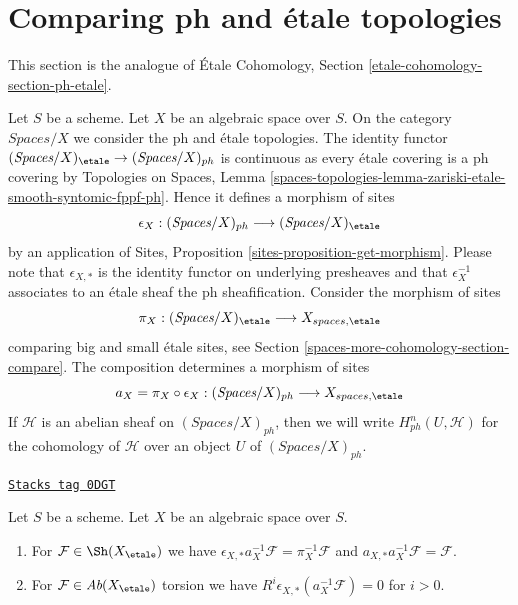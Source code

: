 \section{Comparing ph and \'etale topologies}
\label{spaces-more-cohomology-section-ph-etale}
This section is the analogue of
\'Etale Cohomology, Section \ref{etale-cohomology-section-ph-etale}.

\medskip\noindent
Let $S$ be a scheme. Let $X$ be an algebraic space over $S$.
On the category $\textit{Spaces}/X$ we consider the ph
and \'etale topologies. The identity functor
$(\textit{Spaces}/X)_\etale \to (\textit{Spaces}/X)_{ph}$
is continuous as every \'etale covering is a ph covering by
Topologies on Spaces, Lemma
\ref{spaces-topologies-lemma-zariski-etale-smooth-syntomic-fppf-ph}.
Hence it defines a morphism of sites
$$
\epsilon_X :
(\textit{Spaces}/X)_{ph} \longrightarrow (\textit{Spaces}/X)_\etale
$$
by an application of Sites, Proposition \ref{sites-proposition-get-morphism}.
Please note that $\epsilon_{X, *}$ is the identity functor on underlying
presheaves and that $\epsilon_X^{-1}$ associates to an \'etale sheaf the
ph sheafification.
Consider the morphism of sites
$$
\pi_X : (\textit{Spaces}/X)_\etale \longrightarrow X_{spaces, \etale}
$$
comparing big and small \'etale sites, see Section \ref{spaces-more-cohomology-section-compare}.
The composition determines a morphism of sites
$$
a_X = \pi_X \circ \epsilon_X :
(\textit{Spaces}/X)_{ph}
\longrightarrow
X_{spaces, \etale}
$$
If $\mathcal{H}$ is an abelian sheaf on $(\textit{Spaces}/X)_{ph}$,
then we will write $H^n_{ph}(U, \mathcal{H})$ for the cohomology
of $\mathcal{H}$ over an object $U$ of $(\textit{Spaces}/X)_{ph}$.

\begin{lemma}
\label{spaces-more-cohomology-lemma-comparison-ph-etale}
\href{https://stacks.math.columbia.edu/tag/0DGT}{\texttt{Stacks tag 0DGT}}

Let $S$ be a scheme. Let $X$ be an algebraic space over $S$.
\begin{enumerate}
\item For $\mathcal{F} \in \Sh(X_\etale)$ we have
$\epsilon_{X, *}a_X^{-1}\mathcal{F} = \pi_X^{-1}\mathcal{F}$
and $a_{X, *}a_X^{-1}\mathcal{F} = \mathcal{F}$.
\item For $\mathcal{F} \in \textit{Ab}(X_\etale)$ torsion we have
$R^i\epsilon_{X, *}(a_X^{-1}\mathcal{F}) = 0$ for $i > 0$.
\end{enumerate}
\end{lemma}


